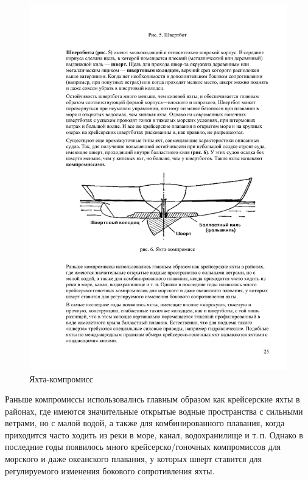 \documentclass[a4paper, 12pt, twoside, final]{scrbook}
\begin{document}
\begin{figure}[htbp]
\centering
\includegraphics{pics/Kompromiss}
\protect\caption{\label{fig:6}Яхта-компромисс}
\end{figure}


Раньше компромиссы использовались главным образом как крейсерские
яхты в районах, где имеются значительные открытые водные пространства
с сильными ветрами, но с малой водой, а также для комбинированного
плавания, когда приходится часто ходить из реки в море, канал, водохранилище
и т.\,п. Однако в последние годы появилось много крейсерско\-/гоночных
компромиссов для морского и даже океанского плавания, у которых шверт
ставится для регулируемого изменения бокового сопротивления яхты.
\end{document}
